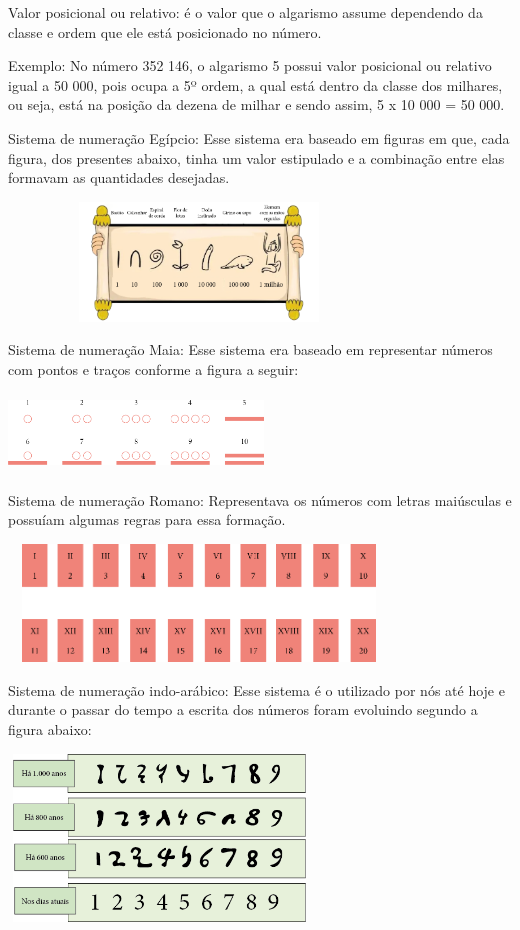 Valor posicional ou relativo: é o valor que o algarismo assume
dependendo da classe e ordem que ele está posicionado no número.

Exemplo: No número 352 146, o algarismo 5 possui valor posicional ou
relativo igual a 50 000, pois ocupa a 5º ordem, a qual está dentro da
classe dos milhares, ou seja, está na posição da dezena de milhar e
sendo assim, 5 x 10 000 = 50 000.

Sistema de numeração Egípcio: Esse sistema era baseado em figuras em
que, cada figura, dos presentes abaixo, tinha um valor estipulado e a
combinação entre elas formavam as quantidades desejadas.

\includegraphics[width=3.98368in,height=1.25011in]{media/image2.png}

Sistema de numeração Maia: Esse sistema era baseado em representar
números com pontos e traços conforme a figura a seguir:

\includegraphics[width=2.66690in,height=0.81674in]{media/image3.png}

Sistema de numeração Romano: Representava os números com letras
maiúsculas e possuíam algumas regras para essa formação.

\includegraphics[width=3.97534in,height=1.23344in]{media/image4.png}

Sistema de numeração indo-arábico: Esse sistema é o utilizado por nós
até hoje e durante o passar do tempo a escrita dos números foram
evoluindo segundo a figura abaixo:

\includegraphics[width=3.15027in,height=1.75015in]{media/image5.png}


